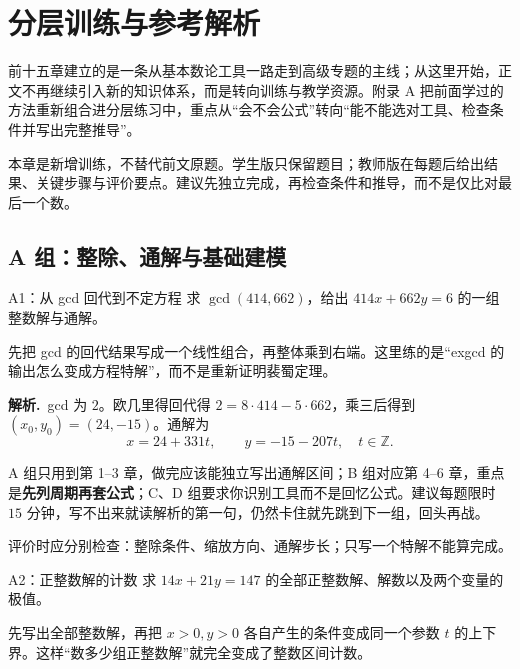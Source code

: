 \documentclass[UTF8,a4paper,11pt,twoside,openright,fontset=fandol]{ctexbook}
\theoremstyle{definition}
\newcommand{\Z}{\mathbb Z}
\newcommand{\sol}{\par\noindent\textbf{解析.}\ }
\begin{document}
\chapter{分层训练与参考解析}
\begin{chapterintro}[章节导读]
前十五章建立的是一条从基本数论工具一路走到高级专题的主线；从这里开始，正文不再继续引入新的知识体系，而是转向训练与教学资源。附录 A 把前面学过的方法重新组合进分层练习中，重点从“会不会公式”转向“能不能选对工具、检查条件并写出完整推导”。
\end{chapterintro}

本章是新增训练，不替代前文原题。学生版只保留题目；教师版在每题后给出结果、关键步骤与评价要点。建议先独立完成，再检查条件和推导，而不是仅比对最后一个数。

\section{A 组：整除、通解与基础建模}
\begin{problem}{A1：从 gcd 回代到不定方程}
求 $\gcd(414,662)$，给出 $414x+662y=6$ 的一组整数解与通解。
\end{problem}

\begin{pitfall}[讲解：先看这题到底在做什么]
先把 gcd 的回代结果写成一个线性组合，再整体乘到右端。这里练的是“exgcd 的输出怎么变成方程特解”，而不是重新证明裴蜀定理。
\end{pitfall}

\sol gcd 为 $2$。欧几里得回代得 $2=8\cdot414-5\cdot662$，乘三后得到 $(x_0,y_0)=(24,-15)$。通解为
\[
 x=24+331t,\qquad y=-15-207t,\quad t\in\Z.
\]

\begin{tip}[三档练习的用法]
A 组只用到第 1--3 章，做完应该能独立写出通解区间；B 组对应第 4--6 章，重点是\textbf{先列周期再套公式}；C、D 组要求你识别工具而不是回忆公式。建议每题限时 $15$ 分钟，写不出来就读解析的第一句，仍然卡住就先跳到下一组，回头再战。
\end{tip}

评价时应分别检查：整除条件、缩放方向、通解步长；只写一个特解不能算完成。


\begin{problem}{A2：正整数解的计数}
求 $14x+21y=147$ 的全部正整数解、解数以及两个变量的极值。
\end{problem}

\begin{pitfall}[讲解：先看这题到底在做什么]
先写出全部整数解，再把 $x>0,y>0$ 各自产生的条件变成同一个参数 $t$ 的上下界。这样“数多少组正整数解”就完全变成了整数区间计数。
\end{pitfall}
\end{document}
